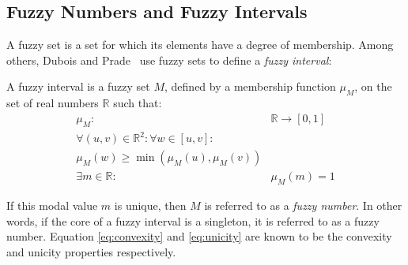 

\subsection{\label{subsec:fuzzy-numbers}Fuzzy Numbers and Fuzzy Intervals}
A fuzzy set is a set for which its elements have a degree of membership. Among others, Dubois and Prade~\cite{Dubois1983} use fuzzy sets \cite{Zadeh1965} to define a \emph{fuzzy interval}:
\begin{definition}
A fuzzy interval is a fuzzy set $M$, defined by a membership function $\mu_{M}$, on the set of real numbers $\mathbb{R}$ such that:
\begin{eqnarray}
\mu_{M} : & \mathbb{R} \rightarrow \left[0,1\right] \nonumber \\ 
\label{eq:convexity}
\forall (u,v)\in\mathbb{R}^2: \forall w \in [u,v]:& \\
\nonumber
\mu_M(w) \geq\min(\mu_M(u),\mu_M(v))  \\
\label{eq:unicity}
\exists m \in \mathbb{R} : &  \mu_M(m)=1 
\end{eqnarray}
\end{definition}
If this modal value $m$ is unique, then $M$ is referred to as a \emph{fuzzy number}. In other words, if the core of a fuzzy interval is a singleton, it is referred to as a fuzzy number.
Equation \eqref{eq:convexity} and \eqref{eq:unicity} are known to be the convexity and unicity properties respectively.

